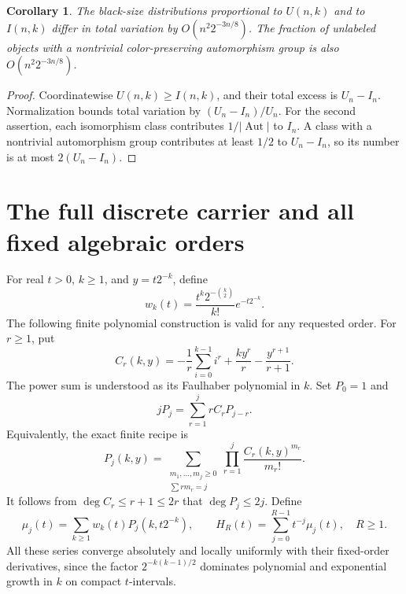 \documentclass[11pt]{article}
\newtheorem{corollary}[theorem]{Corollary}
\theoremstyle{remark}\newtheorem{remark}[theorem]{Remark}
\begin{document}
\begin{corollary}\label{mis:cor:tv-burnside}
The black-size distributions proportional to $U(n,k)$ and to $I(n,k)$ differ in total variation by $O(n^2 2^{-3n/8})$. The fraction of unlabeled objects with a nontrivial color-preserving automorphism group is also $O(n^2 2^{-3n/8})$.
\end{corollary}
\begin{proof}
Coordinatewise $U(n,k)\ge I(n,k)$, and their total excess is $U_n-I_n$. Normalization bounds total variation by $(U_n-I_n)/U_n$. For the second assertion, each isomorphism class contributes $1/|\operatorname{Aut}|$ to $I_n$. A class with a nontrivial automorphism group contributes at least $1/2$ to $U_n-I_n$, so its number is at most $2(U_n-I_n)$.
\end{proof}

\section{The full discrete carrier and all fixed algebraic orders}
For real $t>0$, $k\ge1$, and $y=t2^{-k}$, define
\begin{equation}\label{mis:eq:weights}
 w_k(t)=\frac{t^k 2^{-\binom k2}}{k!}e^{-t2^{-k}}.
\end{equation}
The following finite polynomial construction is valid for any requested order. For $r\ge1$, put
\begin{equation}\label{mis:eq:Cr}
 C_r(k,y)=-\frac1r\sum_{i=0}^{k-1}i^r+\frac{k y^r}{r}-\frac{y^{r+1}}{r+1}.
\end{equation}
The power sum is understood as its Faulhaber polynomial in $k$. Set $P_0=1$ and
\begin{equation}\label{mis:eq:P-rec}
 jP_j=\sum_{r=1}^j rC_rP_{j-r}.
\end{equation}
Equivalently, the exact finite recipe is
\begin{equation}\label{mis:eq:P-finite}
 P_j(k,y)=\sum_{\substack{m_1,\ldots,m_j\ge0\\\sum r m_r=j}}
             \prod_{r=1}^j\frac{C_r(k,y)^{m_r}}{m_r!}.
\end{equation}
It follows from $\deg C_r\le r+1\le2r$ that $\deg P_j\le2j$. Define
\begin{equation}\label{mis:eq:carrier}
 \mu_j(t)=\sum_{k\ge1}w_k(t)P_j(k,t2^{-k}),\qquad
 H_R(t)=\sum_{j=0}^{R-1}t^{-j}\mu_j(t),\quad R\ge1.
\end{equation}
All these series converge absolutely and locally uniformly with their fixed-order derivatives, since the factor $2^{-k(k-1)/2}$ dominates polynomial and exponential growth in $k$ on compact $t$-intervals.
\end{document}
